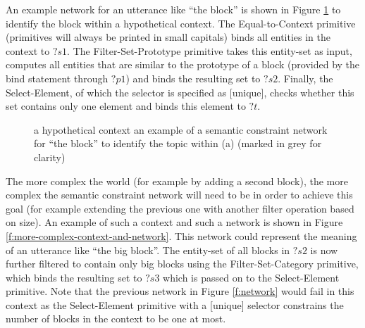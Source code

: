 An example network for an utterance like ``the block'' is shown in
Figure \ref{f:context-and-network} to identify the block within a
hypothetical context. The {\sc Equal-to-Context} primitive (primitives
will always be printed in small capitals) binds all entities in the
context to $?s1$. The {\sc Filter-Set-Proto\-type} primitive takes
this entity-set as input, computes all entities that are similar to
the prototype of a block (provided by the bind statement through $?p1$)
and binds the resulting set to $?s2$. Finally, the {\sc
  Select-Element}, of which the selector is specified as [unique],
checks whether this set contains only one element and binds this
element to $?t$.

\begin{figure}[htbp]
\centering
{}
\caption[Example semantic constraint network for ``the
block'']{ a hypothetical context 
  an example of a semantic constraint network for ``the block'' to
  identify the topic within (a) (marked in grey for clarity)}
\label{f:context-and-network}
\end{figure}

The more complex the world (for example by adding a second block), the
more complex the semantic constraint network will need to be in order
to achieve this goal (for example extending the previous one with
another filter operation based on size). An example of such a context
and such a network is shown in Figure
\ref{f:more-complex-context-and-network}. This network could represent
the meaning of an utterance like ``the big block''. The entity-set of
all blocks in $?s2$ is now further filtered to contain only big blocks
using the {\sc Filter-Set-Category} primitive, which binds the
resulting set to $?s3$ which is passed on to the {\sc Select-Element}
primitive. Note that the previous network in Figure \ref{f:network}
would fail in this context as the {\sc Select-Element} primitive with
a [unique] selector constrains the number of blocks in the context to
be one at most.


